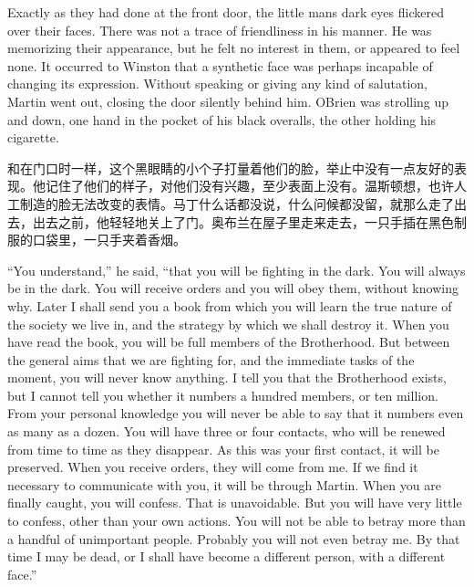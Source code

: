 \begin{paracol}{2}
\switchcolumn*

Exactly as they had done at the front door, the little
man\textquotesingle s dark eyes flickered over their faces. There was
not a trace of friendliness in his manner. He was memorizing their
appearance, but he felt no interest in them, or appeared to feel none.
It occurred to Winston that a synthetic face was perhaps incapable of
changing its expression. Without speaking or giving any kind of
salutation, Martin went out, closing the door silently behind him.
O\textquotesingle Brien was strolling up and down, one hand in the
pocket of his black overalls, the other holding his cigarette.

\switchcolumn

和在门口时一样，这个黑眼睛的小个子打量着他们的脸，举止中没有一点友好的表现。他记住了他们的样子，对他们没有兴趣，至少表面上没有。温斯顿想，也许人工制造的脸无法改变的表情。马丁什么话都没说，什么问候都没留，就那么走了出去，出去之前，他轻轻地关上了门。奥布兰在屋子里走来走去，一只手插在黑色制服的口袋里，一只手夹着香烟。

\switchcolumn*

``You understand,'' he said, ``that you will be fighting in the dark. You
will always be in the dark. You will receive orders and you will obey
them, without knowing why. Later I shall send you a book from which you
will learn the true nature of the society we live in, and the strategy
by which we shall destroy it. When you have read the book, you will be
full members of the Brotherhood. But between the general aims that we
are fighting for, and the immediate tasks of the moment, you will never
know anything. I tell you that the Brotherhood exists, but I cannot tell
you whether it numbers a hundred members, or ten million. From your
personal knowledge you will never be able to say that it numbers even as
many as a dozen. You will have three or four contacts, who will be
renewed from time to time as they disappear. As this was your first
contact, it will be preserved. When you receive orders, they will come
from me. If we find it necessary to communicate with you, it will be
through Martin. When you are finally caught, you will confess. That is
unavoidable. But you will have very little to confess, other than your
own actions. You will not be able to betray more than a handful of
unimportant people. Probably you will not even betray me. By that time I
may be dead, or I shall have become a different person, with a different
face.''

\switchcolumn


\end{paracol}
